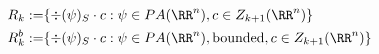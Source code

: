 
\begin{align*}
    R_k:= &\{\div(\psi)_S\cdot c : \psi\in PA(\RR^n), c\in Z_{k+1}(\RR^n)\}\\
    R_k^b:=&\{\div(\psi)_S\cdot c : \psi\in PA(\RR^n), \text{bounded} , c\in Z_{k+1}(\RR^n)\}
\end{align*}

